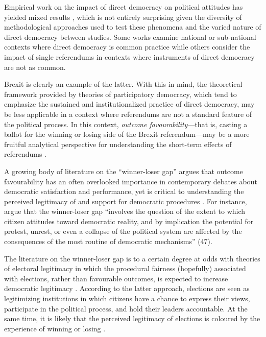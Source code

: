 \documentclass[12pt, letter]{article}
\begin{document}
Empirical work on the impact of direct democracy on political attitudes has yielded mixed results \parencite{mendelsohn2000effect, bowler2002democracy, smith2004educated, dyck2009direct}, which is not entirely surprising given the diversity of methodological approaches used to test these phenomena and the varied nature of direct democracy between studies. Some works examine national or sub-national contexts where direct democracy is common practice while others consider the impact of single referendums in contexts where instruments of direct democracy are not as common. 

Brexit is clearly an example of the latter. With this in mind, the theoretical framework provided by theories of participatory democracy, which tend to emphasize the sustained and institutionalized practice of direct democracy, may be less applicable in a context where referendums are not a standard feature of the political process. In this context, \textit{outcome favourability}---that is, casting a ballot for the winning or losing side of the Brexit referendum---may be a more fruitful analytical perspective for understanding the short-term effects of referendums \parencite{marien2017winner}. 

A growing body of literature on the ``winner-loser gap'' argues that outcome favourability has an often overlooked importance in contemporary debates about democratic satisfaction and performance, yet is critical to understanding the perceived legitimacy of and support for democratic procedures \parencite{blais2007winning}. For instance, \textcite{anderson2005losers} argue that the winner-loser gap  ``involves the question of the extent to which citizen attitudes toward democratic reality, and by implication the potential for protest, unrest, or even a collapse of the political system are affected by the consequences of the most routine of democratic mechanisms'' (47). 

The literature on the winner-loser gap is to a certain degree at odds with theories of electoral legitimacy in which the procedural fairness (hopefully) associated with elections, rather than favourable outcomes, is expected to increase democratic legitimacy \parencite{hooghe2016elections}. 
According to the latter approach, elections are seen as legitimizing institutions in which citizens have a chance to express their views, participate in the political process, and hold their leaders accountable. At the same time, it is likely that the perceived legitimacy of elections is coloured by the experience of winning or losing \parencite{nadeau1993accepting}.
\end{document}
